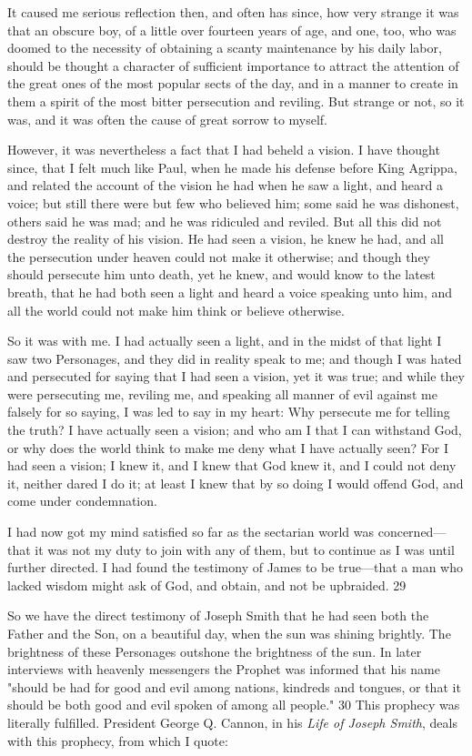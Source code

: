 It caused me serious reflection then, and often has since, how very strange it was that an
obscure boy, of a little over fourteen years of age, and one, too, who was doomed to the
necessity of obtaining a scanty maintenance by his daily labor, should be thought a character
of sufficient importance to attract the attention of the great ones of the most popular sects of
the day, and in a manner to create in them a spirit of the most bitter persecution and reviling.
But strange or not, so it was, and it was often the cause of great sorrow to myself.

However, it was nevertheless a fact that I had beheld a vision. I have thought since, that I felt
much like Paul, when he made his defense before King Agrippa, and related the account of
the vision he had when he saw a light, and heard a voice; but still there were but few who
believed him; some said he was dishonest, others said he was mad; and he was ridiculed and
reviled. But all this did not destroy the reality of his vision. He had seen a vision, he knew he
had, and all the persecution under heaven could not make it otherwise; and though they
should persecute him unto death, yet he knew, and would know to the latest breath, that he
had both seen a light and heard a voice speaking unto him, and all the world could not make
him think or believe otherwise.

So it was with me. I had actually seen a light, and in the midst of that light I saw two
Personages, and they did in reality speak to me; and though I was hated and persecuted for
saying that I had seen a vision, yet it was true; and while they were persecuting me, reviling
me, and speaking all manner of evil against me falsely for so saying, I was led to say in my
heart: Why persecute me for telling the truth? I have actually seen a vision; and who am I
that I can withstand God, or why does the world think to make me deny what I have actually
seen? For I had seen a vision; I knew it, and I knew that God knew it, and I could not deny it,
neither dared I do it; at least I knew that by so doing I would offend God, and come under
condemnation.

I had now got my mind satisfied so far as the sectarian world was concerned—that it was not
my duty to join with any of them, but to continue as I was until further directed. I had found
the testimony of James to be true—that a man who lacked wisdom might ask of God, and
obtain, and not be upbraided. 29

So we have the direct testimony of Joseph Smith that he had seen both the Father and the
Son, on a beautiful day, when the sun was shining brightly. The brightness of these
Personages outshone the brightness of the sun. In later interviews with heavenly messengers
the Prophet was informed that his name "should be had for good and evil among nations,
kindreds and tongues, or that it should be both good and evil spoken of among all people." 30
This prophecy was literally fulfilled. President George Q. Cannon, in his \textit{Life of Joseph
Smith}, deals with this prophecy, from which I quote:

